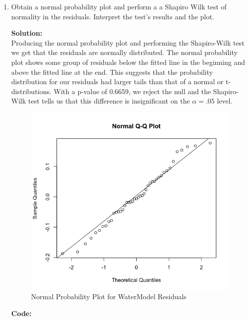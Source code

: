\documentclass[12pt]{article}
\makeatletter
\theoremstyle{homework}
\newenvironment{exercise}[1]
{\def\@currentlabel{#1}\exercisecore}
{\endexercisecore}
\newcommand{\localhead}[1]{\par\smallskip\noindent\textbf{#1}\nobreak\\}%
\newcommand\solution{\localhead{Solution:}}
\makeatother
\begin{document}
\begin{exercise}{3}
\begin{enumerate}
    \item Obtain a normal probability plot and perform a a Shapiro Wilk test of normality in the residuals. Interpret the test's
    results and the plot. \\
    \solution Producing the normal probability plot and performing the Shapiro-Wilk test we get that the residuals are normally distributed. 
    The normal probability plot shows some group of residuals below the fitted line in the beginning and above the fitted line at the end. This suggests
    that the probability distribution for our residuals had larger tails than that of a normal or t-distributions. With a p-value of 0.6659, we reject the null and the 
    Shapiro-Wilk test tells us that this difference is insignificant on the $\alpha = .05$ level. 
    \begin{figure}[H]
      \begin{center}
      \caption{Normal Probability Plot for WaterModel Residuals}
      \includegraphics[width = .80\textwidth]{Rplot04.png}
    \end{center}
  \end{figure}
  \textbf{Code:}
  \begin{center}
  
  \end{center} 
  \newpage


\end{enumerate}
\end{exercise}
\end{document}
